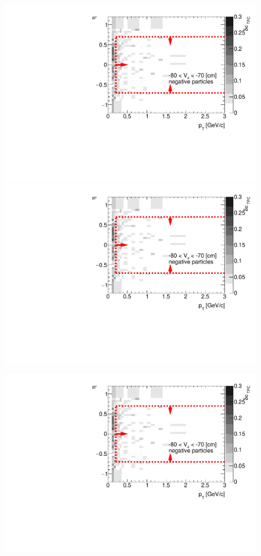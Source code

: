 \begin{figure}[H]
{		\includegraphics[width=\linewidth,page=27]{graphics/systematicsEfficiency/deadMaterial/secondaries_Unbinned_Charged_SD.pdf}
		\includegraphics[width=\linewidth,page=30]{graphics/systematicsEfficiency/deadMaterial/secondaries_Unbinned_Charged_SD.pdf}\\
	}%
	\parbox{0.325\textwidth}{
		\includegraphics[width=\linewidth,page=19]{graphics/systematicsEfficiency/deadMaterial/secondaries_Unbinned_Charged_SD.pdf}\\
}
\end{figure}
